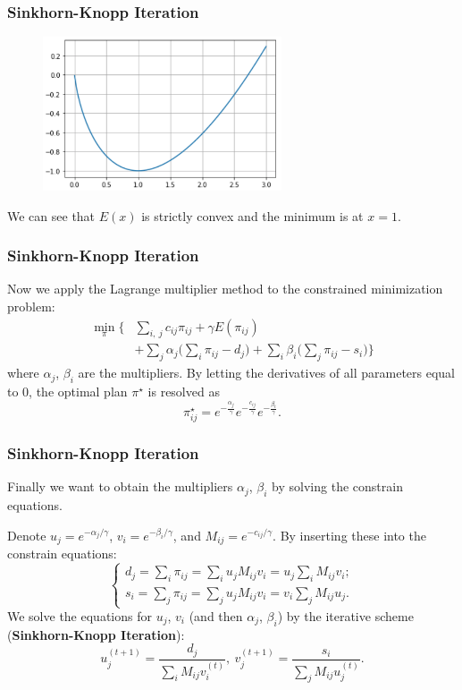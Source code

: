 \documentclass[slidetop, mathserif, dvipsnames]{beamer}
\begin{document}
\begin{frame}
    \frametitle{Sinkhorn-Knopp Iteration}

    \begin{figure}
        \includegraphics[width=200pt]{pics/ota_entropic_regularization.png}
    \end{figure}

    We can see that $E(x)$ is strictly convex and
    the minimum is at $x=1$.

\end{frame}

\begin{frame}
    \frametitle{Sinkhorn-Knopp Iteration}

    Now we apply the Lagrange multiplier method
    to the constrained minimization problem:
    \begin{align*}
        \min_{\pi} \Big\{ & \sum_{i,~j} c_{ij}\pi_{ij}+\gamma E(\pi_{ij}) \\
            & + \sum_j \alpha_j\Big(\sum_i \pi_{ij} - d_j\Big)
            + \sum_i \beta_i \Big(\sum_j \pi_{ij} - s_i\Big)
            \Big\}
    \end{align*}
    where $\alpha_j$, $\beta_i$ are the multipliers.
    By letting the derivatives of all parameters equal to 0,
    the optimal plan $\pi^\star$ is resolved as
    \[
        \pi_{ij}^\star =
        e^{-\frac{\alpha_j}{\gamma}}e^{-\frac{c_{ij}}{\gamma}}
        e^{-\frac{\beta_i}{\gamma}}.
    \]

\end{frame}


\begin{frame}
    \frametitle{Sinkhorn-Knopp Iteration}

    Finally we want to obtain the multipliers $\alpha_j$, $\beta_i$
    by solving the constrain equations.

    \quad 

    Denote $u_j = e^{-\alpha_j/\gamma}$, $v_i = e^{-\beta_i/\gamma}$,
    and $M_{ij} = e^{-c_{ij}/\gamma}$.
    By inserting these into the constrain equations:
    \[
        \begin{cases}
        d_j = \sum_i \pi_{ij} = \sum_i u_jM_{ij}v_i = u_j \sum_i M_{ij}v_i; \\
        s_i = \sum_j \pi_{ij} = \sum_j u_jM_{ij}v_i = v_i \sum_j M_{ij}u_j.
        \end{cases}
    \]
    We solve the equations for $u_j$, $v_i$ (and then $\alpha_j$, $\beta_i$)
    by the iterative scheme ({\bf Sinkhorn-Knopp Iteration}):
    \[
        u_j^{(t+1)} = \dfrac{d_j}{\sum_i M_{ij}v_i^{(t)}},~
        v_j^{(t+1)} = \dfrac{s_i}{\sum_j M_{ij}u_j^{(t)}}.
    \]

\end{frame}
\end{document}
